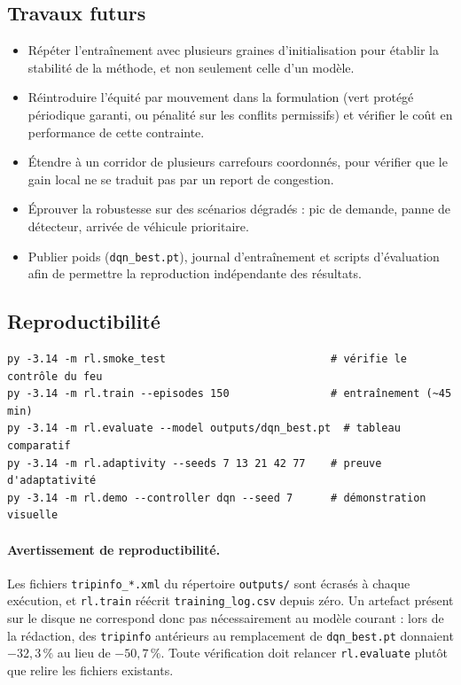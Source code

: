 \documentclass[11pt,a4paper]{article}
\begin{document}
\subsection{Travaux futurs}

\begin{itemize}
  \item Répéter l'entraînement avec plusieurs graines d'initialisation pour établir la
        stabilité de la méthode, et non seulement celle d'un modèle.
  \item Réintroduire l'équité par mouvement dans la formulation (vert protégé
        périodique garanti, ou pénalité sur les conflits permissifs) et vérifier le
        coût en performance de cette contrainte.
  \item Étendre à un corridor de plusieurs carrefours coordonnés, pour vérifier que le
        gain local ne se traduit pas par un report de congestion.
  \item Éprouver la robustesse sur des scénarios dégradés : pic de demande, panne de
        détecteur, arrivée de véhicule prioritaire.
  \item Publier poids (\texttt{dqn\_best.pt}), journal d'entraînement et scripts
        d'évaluation afin de permettre la reproduction indépendante des résultats.
\end{itemize}

\subsection{Reproductibilité}

\begin{verbatim}
py -3.14 -m rl.smoke_test                          # vérifie le contrôle du feu
py -3.14 -m rl.train --episodes 150                # entraînement (~45 min)
py -3.14 -m rl.evaluate --model outputs/dqn_best.pt  # tableau comparatif
py -3.14 -m rl.adaptivity --seeds 7 13 21 42 77    # preuve d'adaptativité
py -3.14 -m rl.demo --controller dqn --seed 7      # démonstration visuelle
\end{verbatim}

\paragraph{Avertissement de reproductibilité.} Les fichiers \texttt{tripinfo\_*.xml}
du répertoire \texttt{outputs/} sont écrasés à chaque exécution, et
\texttt{rl.train} réécrit \texttt{training\_log.csv} depuis zéro. Un artefact
présent sur le disque ne correspond donc pas nécessairement au modèle courant : lors
de la rédaction, des \texttt{tripinfo} antérieurs au remplacement de
\texttt{dqn\_best.pt} donnaient $-32{,}3\,\%$ au lieu de $-50{,}7\,\%$. Toute
vérification doit relancer \texttt{rl.evaluate} plutôt que relire les fichiers
existants.
\end{document}
